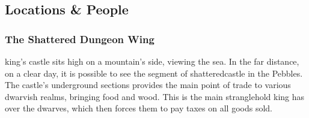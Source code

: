 \begin{multicols}{2}
{\subsection{Locations \& People}

}

\subsubsection{The Shattered Dungeon Wing}

\Gls{king}'s castle sits high on a mountain's side, viewing the sea.
In the far distance, on a clear day, it is possible to see the segment of \gls{shatteredcastle} in the Pebbles.
The castle's underground sections provides the main point of trade to various dwarvish realms, bringing food and wood.
This is the main stranglehold \gls{king} has over the dwarves, which then forces them to pay taxes on all goods sold.



\end{multicols}
